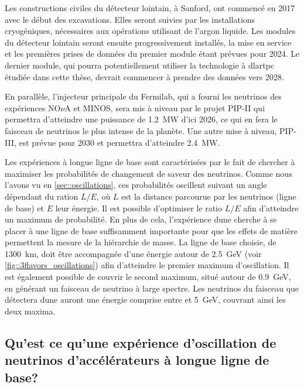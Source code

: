         Les constructions civiles du détecteur lointain, à Sanford, ont commencé en 2017 avec le début des excavations. Elles seront suivies par les installations cryogéniques, nécessaires aux opérations utilisant de l'argon liquide. Les modules du détecteur lointain seront ensuite progressivement installés, la mise en service et les premières prises de données du premier module étant prévues pour 2024\cite{Acciarri2016}. Le dernier module, qui pourra potentiellement utiliser la technologie à \gls{dlartpc} étudiée dans cette thèse, devrait commencer à prendre des données vers 2028.
        
        En parallèle, l'injecteur principale du Fermilab, qui a fourni les neutrinos des expériences NO$\nu$A et MINOS, sera mis à niveau par le projet PIP-II qui permettra d'atteindre une puissance de \SI{1.2}{\mega\watt} d'ici 2026, ce qui en fera le faisceau de neutrinos le plus intense de la planète. Une autre mise à niveau, PIP-III, est prévue pour 2030 et permettra d'atteindre \SI{2.4}{\mega\watt}.
        
        Les expériences à longue ligne de base sont caractérisées par le fait de chercher à maximiser les probabilités de changement de saveur des neutrinos. Comme nous l'avons vu en \autoref{sec::oscillations}, ces probabilités oscillent suivant un angle dépendant du ration $L/E$, où $L$ est la distance parcourue par les neutrinos (ligne de base) et $E$ leur énergie. Il est possible d'optimiser le ratio $L/E$ afin d'atteindre un maximum de probabilité. En plus de cela, l'expérience \gls{dune} cherche à se placer à une ligne de base suffisamment importante pour que les effets de matière permettent la mesure de la hiérarchie de masse. La ligne de base choisie, de \SI{1300}{\kilo\meter}, doit être accompagnée d'une énergie autour de \SI{2.5}{\giga\electronvolt} (voir \autoref{fig::3flavors_oscillations}) afin d'atteindre le premier maximum d'oscillation. Il est également possible de couvrir le second maximum, situé autour de \SI{0.9}{\giga\electronvolt}, en générant un faisceau de neutrino à large spectre. Les neutrinos du faisceau que détectera \gls{dune} auront une énergie comprise entre  et \SI{5}{\giga\electronvolt}, couvrant ainsi les deux maxima.
        
        \subsection{Qu'est ce qu'une expérience d'oscillation de neutrinos d'accélérateurs à longue ligne de base?}
            
